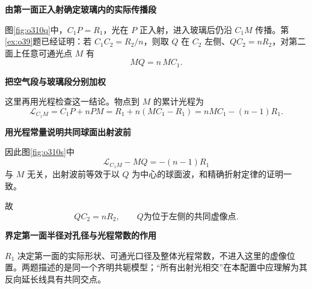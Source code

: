 \begin{solution}\textbf{由第一面正入射确定玻璃内的实际传播段}\par\nobreak
图\ref{fig:o310q}中，\(C_1P=R_1\)，光在 \(P\) 正入射，进入玻璃后仍沿 \(C_1M\) 传播。第\ref{ex:o39}题已经证明：若 \(C_1C_2=R_2/n\)，则取 \(Q\) 在 \(C_2\) 左侧、\(QC_2=nR_2\)，对第二面上任意可通光点 \(M\) 有
\[
 MQ=n\,MC_1.
\]


\par\medskip{}\noindent\textbf{把空气段与玻璃段分别加权}\par\nobreak
这里再用光程检查这一结论。物点到 \(M\) 的累计光程为
\[
 \mathcal L_{C_1M}=C_1P+nPM
 =R_1+n(MC_1-R_1)
 =nMC_1-(n-1)R_1.
\]



\par\medskip{}\noindent\textbf{用光程常量说明共同球面出射波前}\par\nobreak
因此图\ref{fig:o310s}中
\[
 \mathcal L_{C_1M}-MQ=-(n-1)R_1
\]
与 \(M\) 无关，出射波前等效于以 \(Q\) 为中心的球面波，和精确折射定律的证明一致。

故
\[
 \boxed{QC_2=nR_2},\qquad Q\text{为位于左侧的共同虚像点}.
\]


\par\medskip{}\noindent\textbf{界定第一面半径对孔径与光程常数的作用}\par\nobreak
\(R_1\) 决定第一面的实际形状、可通光口径及整体光程常数，不进入这里的虚像位置。两题描述的是同一个齐明共轭模型；“所有出射光相交”在本配置中应理解为其反向延长线具有共同交点。
\end{solution}

